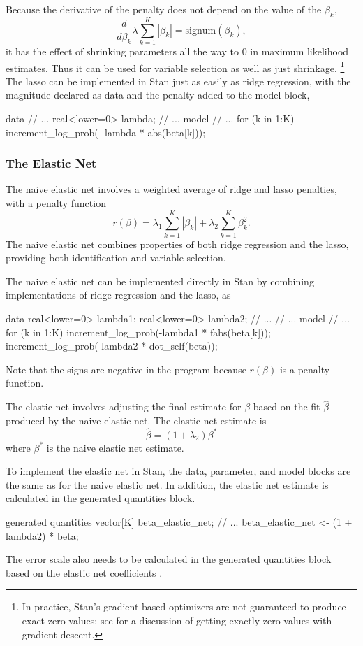 Because the derivative of the penalty does not depend on the value of
the $\beta_k$,
\[
\frac{d}{d\beta_k} \lambda \sum_{k=1}^K | \beta_k | =
\mbox{signum}(\beta_k),
\]
it has the effect of shrinking parameters all the way to 0 in maximum
likelihood estimates.  Thus it can be used for variable selection as
well as just shrinkage.%
%
\footnote{In practice, Stan's gradient-based optimizers are not
  guaranteed to produce exact zero values; see
  \cite{LangfordEtAl:2009} for a discussion of getting exactly zero
  values with gradient descent.}
%
The lasso can be implemented in Stan just as easily as ridge
regression, with the magnitude declared as data and the penalty added
to the model block,
%
\begin{stancode}
data {
  // ...
  real<lower=0> lambda;
}
// ...
model {
  // ...
  for (k in 1:K)
    increment_log_prob(- lambda * abs(beta[k]));
}
\end{stancode}

\subsubsection{The Elastic Net}

The naive elastic net \citep{ZouHastie:2005} involves a weighted
average of ridge and lasso penalties, with a penalty function
\[
r(\beta)
= \lambda_1 \sum_{k=1}^K |\beta_k|
+ \lambda_2 \sum_{k=1}^K \beta_k^2.
\]
The naive elastic net combines properties of both ridge regression and
the lasso, providing both identification and variable selection.

The naive elastic net can be implemented directly in Stan by combining
implementations of ridge regression and the lasso, as
%
\begin{stancode}
data {
  real<lower=0> lambda1;
  real<lower=0> lambda2;
  // ...
}
// ...
model {
  // ...
  for (k in 1:K)
    increment_log_prob(-lambda1 * fabs(beta[k]));
  increment_log_prob(-lambda2 * dot_self(beta));
}
\end{stancode}
%
Note that the signs are negative in the program because $r(\beta)$ is
a penalty function.

The elastic net \citep{ZouHastie:2005} involves adjusting the final estimate for
$\beta$ based on the fit $\hat{\beta}$ produced by the naive elastic
net.  The elastic net estimate is
\[
\hat{\beta} = (1 + \lambda_2) \beta^*
\]
where $\beta^{*}$ is the naive elastic net estimate.

To implement the elastic net in Stan, the data, parameter, and model
blocks are the same as for the naive elastic net.  In addition, the
elastic net estimate is calculated in the generated quantities block.
%
\begin{stancode}
generated quantities {
  vector[K] beta_elastic_net;
  // ...
  beta_elastic_net <- (1 + lambda2) * beta;
}
\end{stancode}
%
The error scale also needs to be calculated in the generated
quantities block based on the elastic net coefficients
.


